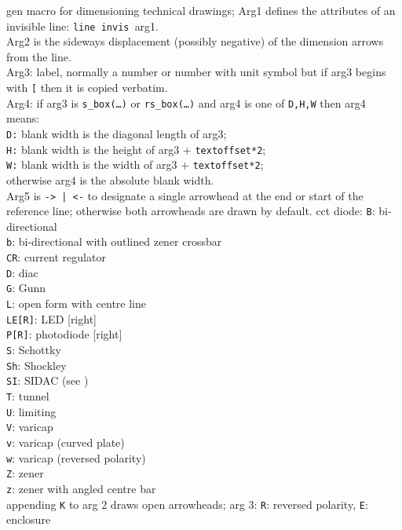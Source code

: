 %
  {gen}%
  {macro for dimensioning technical drawings;
      Arg1 defines the attributes
      of an invisible line: {\tt line invis }arg1.\\
      Arg2 is the sideways displacement (possibly negative) of the
      dimension arrows from the line.\\
      Arg3: label, normally a number or number with unit symbol but
        if arg3 begins with {\tt [} then it is copied verbatim.\\
      Arg4: if arg3 is {\tt s\_box(\ldots)} or {\tt rs\_box(\ldots)} and
      arg4 is one of {\tt D,H,W} then arg4 means:\\
      {\tt D:} blank width is the diagonal length of arg3;\\
      {\tt H:} blank width is the height of arg3 + {\tt textoffset*2};\\
      {\tt W:} blank width is the width of arg3 + {\tt textoffset*2};\\
      otherwise arg4 is the absolute blank width.\\
      Arg5 is {\tt -> | <-} to designate a single arrowhead
      at the end or start of the reference line; otherwise both arrowheads
      are drawn by default.}%
%
  {cct}%
  {diode:
   {\tt B}: bi-directional\\
   {\tt b}: bi-directional with outlined zener crossbar\\
   {\tt CR}: current regulator\\
   {\tt D}: diac\\
   {\tt G}: Gunn\\
   {\tt L}: open form with centre line\\
   {\tt LE[R]}: LED [right]\\
   {\tt P[R]}: photodiode [right]\\
   {\tt S}: Schottky\\
   {\tt Sh}: Shockley\\
   {\tt SI}: SIDAC (see )\\
   {\tt T}: tunnel\\
   {\tt U}: limiting\\
   {\tt V}: varicap\\
   {\tt v}: varicap (curved plate)\\
   {\tt w}: varicap (reversed polarity)\\
   {\tt Z}: zener\\
   {\tt z}: zener with angled centre bar\\
   appending {\tt K} to arg 2 draws open arrowheads;
   arg 3: {\tt R}: reversed polarity, {\tt E}: enclosure }%
